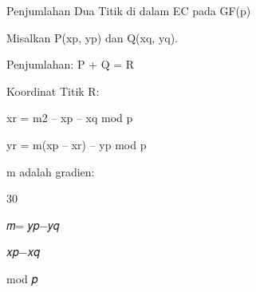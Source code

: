 \documentclass{article}
\begin{document}

Penjumlahan Dua Titik di dalam EC pada GF(p)

Misalkan P(xp, yp) dan Q(xq, yq).  

Penjumlahan: P + Q = R

Koordinat Titik R: 

     xr = m2 – xp – xq mod p

     yr = m(xp – xr) – yp  mod p

 m adalah gradien:


30

𝑚= 𝑦𝑝−𝑦𝑞

𝑥𝑝−𝑥𝑞

mod 𝑝
\end{document}
